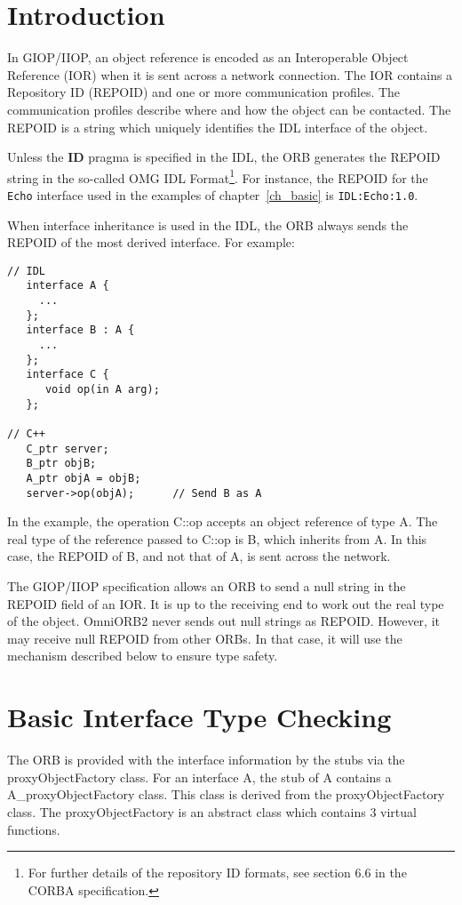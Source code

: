 \documentclass[11pt,twoside,onecolumn]{book}
\begin{document}
\section{Introduction}

In GIOP/IIOP, an object reference is encoded as an Interoperable Object
Reference (IOR) when it is sent across a network connection. The IOR
contains a Repository ID (REPOID) and one or more communication profiles. The
communication profiles describe where and how the object can be
contacted. The REPOID is a string which uniquely identifies the
IDL interface of the object. 

Unless the {\bf ID} pragma is specified in the IDL, the ORB generates the
REPOID string in the so-called OMG IDL Format\footnote{For further details
of the repository ID formats, see section 6.6 in the CORBA
specification.}. For instance, the REPOID for the {\tt Echo} interface used
in the examples of chapter~\ref{ch_basic} is {\tt IDL:Echo:1.0}.

When interface inheritance is used in the IDL, the ORB always sends the
REPOID of the most derived interface. For example:

{\small
\begin{verbatim}
// IDL
   interface A {
     ...
   };
   interface B : A {
     ...
   };
   interface C {
      void op(in A arg);
   };

// C++
   C_ptr server;
   B_ptr objB;
   A_ptr objA = objB;
   server->op(objA);      // Send B as A
\end{verbatim}
}

In the example, the operation C::op accepts an object reference of type
A. The real type of the reference passed to C::op is B, which inherits from
A. In this case, the REPOID of B, and not that of A, is sent across the
network.

The GIOP/IIOP specification allows an ORB to send a null string in the
REPOID field of an IOR. It is up to the receiving end to work out the real
type of the object. OmniORB2 never sends out null strings as
REPOID. However, it may receive null REPOID from other ORBs. In that case,
it will use the mechanism described below to ensure type safety.

\section{Basic Interface Type Checking}
\label{sec_intf}

The ORB is provided with the interface information by the stubs via the
proxyObjectFactory class. For an interface A, the stub of A contains a
A\_proxyObjectFactory class. This class is derived from the
proxyObjectFactory class. The proxyObjectFactory is an abstract class which
contains 3 virtual functions.
\end{document}
